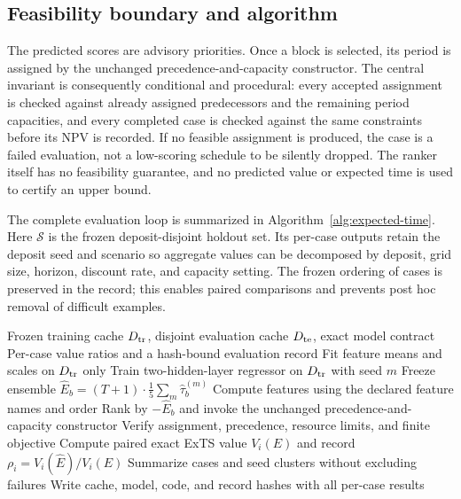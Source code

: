 \documentclass[11pt]{article}
\begin{document}
\subsection{Feasibility boundary and algorithm}
The predicted scores are advisory priorities. Once a block is selected, its period is assigned by the unchanged precedence-and-capacity constructor. The central invariant is consequently conditional and procedural: every accepted assignment is checked against already assigned predecessors and the remaining period capacities, and every completed case is checked against the same constraints before its NPV is recorded. If no feasible assignment is produced, the case is a failed evaluation, not a low-scoring schedule to be silently dropped. The ranker itself has no feasibility guarantee, and no predicted value or expected time is used to certify an upper bound.

The complete evaluation loop is summarized in Algorithm~\ref{alg:expected-time}. Here $\mathcal{S}$ is the frozen deposit-disjoint holdout set. Its per-case outputs retain the deposit seed and scenario so aggregate values can be decomposed by deposit, grid size, horizon, discount rate, and capacity setting. The frozen ordering of cases is preserved in the record; this enables paired comparisons and prevents post hoc removal of difficult examples.
\begin{algorithm}[t]
\caption{Expected-time surrogate evaluation with a fixed schedule constructor}\label{alg:expected-time}
\begin{algorithmic}[1]
\Require Frozen training cache $D_{\rm tr}$, disjoint evaluation cache $D_{\rm te}$, exact model contract
\Ensure Per-case value ratios and a hash-bound evaluation record
\State Fit feature means and scales on $D_{\rm tr}$ only
  \State Train two-hidden-layer regressor on $D_{\rm tr}$ with seed $m$
\EndFor
\State Freeze ensemble $\hat E_b=(T+1)\cdot\frac{1}{5}\sum_m\hat\tau_b^{(m)}$
  \State Compute features using the declared feature names and order
  \State Rank by $-\hat E_b$ and invoke the unchanged precedence-and-capacity constructor
  \State Verify assignment, precedence, resource limits, and finite objective
  \State Compute paired exact ExTS value $V_i(E)$ and record $\rho_i=V_i(\hat E)/V_i(E)$
\EndFor
\State Summarize cases and seed clusters without excluding failures
\State Write cache, model, code, and record hashes with all per-case results
\end{algorithmic}
\end{algorithm}
\end{document}
